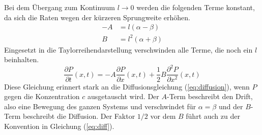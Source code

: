 Bei dem Übergang zum Kontinuum $l \to 0$ werden die folgenden Terme konstant, da sich die Raten wegen der kürzeren Sprungweite erhöhen.
\begin{align}
  - A & = l (\alpha - \beta) \\
  B & = l^2 (\alpha + \beta)
\end{align}
Eingesetzt in die Taylorreihendarstellung verschwinden alle Terme, die noch ein $l$ beinhalten.
\begin{equation}
  \frac{\partial P}{\partial t} (x, t) = - A \frac{\partial P}{\partial x}(x, t) + \frac{1}{2} B \frac{\partial^2 P}{\partial x^2} (x, t)
\end{equation}
Diese Gleichung erinnert stark an die Diffusionsgleichung (\ref{eq:diffusion}), wenn $P$ gegen die Konzentration $c$ ausgetauscht wird. Der $A$-Term beschreibt den Drift, also eine Bewegung des ganzen Systems und verschwindet für $\alpha = \beta$ und der $B$-Term beschreibt die Diffusion. Der Faktor $1/2$ vor dem $B$ führt auch zu der Konvention in Gleichung (\ref{eq:diff}).
